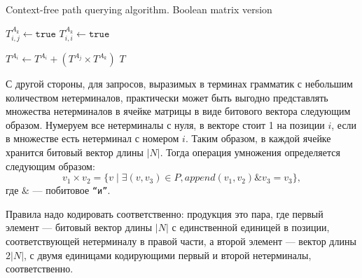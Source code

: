 \begin{algorithm}
\begin{algorithmic}[1]
\caption{Context-free path querying algorithm. Boolean matrix version}
\label{lst:cfpq_mtx_bool}
          {$T^{A_k}_{i,j} \gets \texttt{true}$}
    \EndFor
       {$T^{A_k}_{i,i} \gets \texttt{true}$}
    \EndFor

          { $T^{A_i} \gets T^{A_i} + (T^{A_j} \times T^{A_k})$ }
        \EndFor
    \EndWhile
\State \Return $T$
\EndFunction
\end{algorithmic}
\end{algorithm}

С другой стороны, для запросов, выразимых в терминах грамматик с небольшим количеством нетерминалов, практически может быть выгодно представлять множества нетерминалов в ячейке матрицы в виде битового вектора следующим образом.
Нумеруем все нетерминалы с нуля, в векторе стоит 1 на позиции $i$, если в множестве есть нетерминал с номером $i$.
Таким образом, в каждой ячейке хранится битовый вектор длины $|N|$.
Тогда операция умножения определяется следующим образом:
$$v_1 \times v_2 = \{v \mid \exists (v,v_3) \in P, \textit{append}(v_1, v_2) \& v_3 = v_3\},$$ где $\&$ --- побитовое \texttt{``и''}.

Правила надо кодировать соответственно: продукция это пара, где первый элемент --- битовый вектор длины $|N|$ с единственной единицей в позиции, соответствующей нетерминалу в правой части, а второй элемент --- вектор длины $2|N|$, с двумя единицами кодирующими первый и второй нетерминалы, соответственно.

